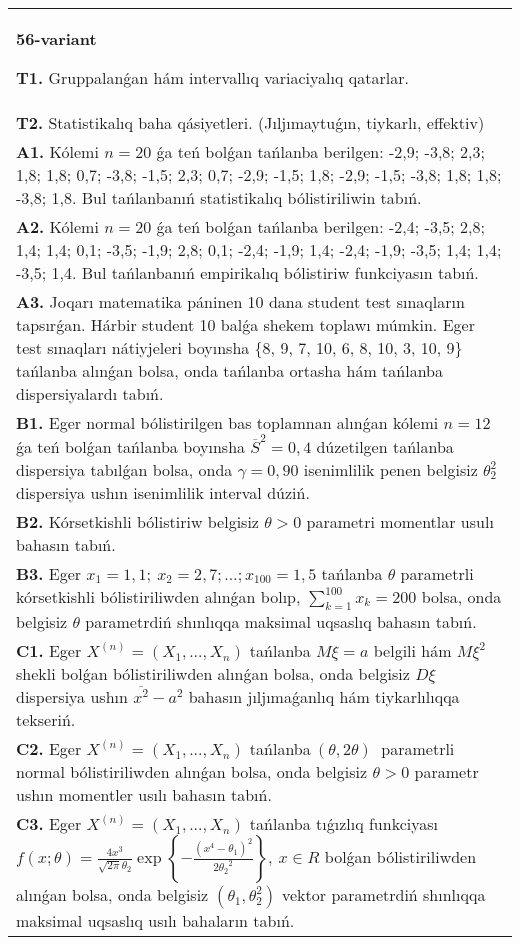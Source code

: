 \documentclass{article}
\begin{document}
\vspace{1cm}


\begin{tabular}{m{17cm}}
\textbf{56-variant}
\newline

\textbf{T1.} 
Gruppalanǵan hám intervallıq variaciyalıq qatarlar.
 \\
\textbf{T2.} 
Statistikalıq baha qásiyetleri. (Jıljımaytuǵın, tiykarlı, effektiv)
 \\
\textbf{A1.} 
Kólemi \(n = 20\) ǵa teń bolǵan tańlanba berilgen: -2,9; -3,8; 2,3; 1,8; 1,8; 0,7; -3,8; -1,5; 2,3; 0,7; -2,9; -1,5; 1,8; -2,9; -1,5; -3,8; 1,8; 1,8; -3,8; 1,8. Bul tańlanbanıń statistikalıq bólistiriliwin tabıń.
 \\
\textbf{A2.} 
Kólemi \(n = 20\) ǵa teń bolǵan tańlanba berilgen: -2,4; -3,5; 2,8; 1,4; 1,4; 0,1; -3,5; -1,9; 2,8; 0,1; -2,4; -1,9; 1,4; -2,4; -1,9; -3,5; 1,4; 1,4; -3,5; 1,4. Bul tańlanbanıń empirikalıq bólistiriw funkciyasın tabıń.
 \\
\textbf{A3.} 
Joqarı matematika páninen 10 dana student test sınaqların tapsırǵan. Hárbir student 10 balǵa shekem toplawı múmkin. Eger test sınaqları nátiyjeleri boyınsha \{8, 9, 7, 10, 6, 8, 10, 3, 10, 9\} tańlanba alınǵan bolsa, onda tańlanba ortasha hám tańlanba dispersiyalardı tabıń.
 \\
\textbf{B1.} 
Eger normal bólistirilgen bas toplamnan alınǵan kólemi \(n = 12\) ǵa teń bolǵan tańlanba boyınsha \({\overline{S}}^{2} = 0,4\) dúzetilgen tańlanba dispersiya tabılǵan bolsa, onda \(\gamma = 0,90\) isenimlilik penen belgisiz \(\theta_{2}^{2}\) dispersiya ushın isenimlilik interval dúziń.
 \\
\textbf{B2.} 
Kórsetkishli bólistiriw belgisiz \(\theta > 0\) parametri momentlar usulı bahasın tabıń.
 \\
\textbf{B3.} 
Eger \(x_{1} = 1,1;\ x_{2} = 2,7;\ldots;x_{100} = 1,5\) tańlanba \(\theta\) parametrli kórsetkishli bólistiriliwden alınǵan bolıp, \(\sum_{k = 1}^{100}x_{k} = 200\) bolsa, onda belgisiz \(\theta\) parametrdiń shınlıqqa maksimal uqsaslıq bahasın tabıń.
 \\
\textbf{C1.} 
Eger \(X^{(n)} = \left( X_{1},...,X_{n} \right)\) tańlanba \(M\xi = a\) belgili hám \(M\xi^{2}\) shekli bolǵan bólistiriliwden alınǵan bolsa, onda belgisiz \(D\xi\) dispersiya ushın \(\overline{x^{2}} - a^{2}\) bahasın jıljımaǵanlıq hám tiykarlılıqqa tekseriń.
 \\
\textbf{C2.} 
Eger \(X^{(n)} = \left( X_{1},...,X_{n} \right)\) tańlanba\(\ (\theta,2\theta)\ \) parametrli normal bólistiriliwden alınǵan bolsa, onda belgisiz \(\theta > 0\) parametr ushın momentler usılı bahasın tabıń.
 \\
\textbf{C3.} 
Eger \(X^{(n)} = \left( X_{1},...,X_{n} \right)\) tańlanba tıǵızlıq funkciyası
$f(x;\theta) = \frac{4x^{3}}{\sqrt{2\pi}\theta_{2}}\exp\left\{ - \frac{\left( x^{4} - \theta_{1} \right)^{2}}{2{\theta_{2}}^{2}} \right\},\ x \in R$
bolǵan bólistiriliwden alınǵan bolsa, onda belgisiz \(\left( \theta_{1},\theta_{2}^{2} \right)\) vektor parametrdiń shınlıqqa maksimal uqsaslıq usılı bahaların tabıń.
 \\

\end{tabular}
\end{document}

